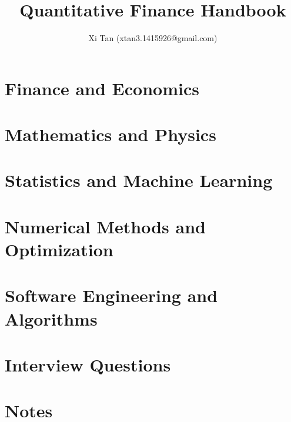 \documentclass{book}
\title{Quantitative Finance Handbook}
\author{Xi Tan (xtan3.1415926@gmail.com)}
\begin{document}
\maketitle
\tableofcontents


\part{Finance and Economics}


\part{Mathematics and Physics}


\part{Statistics and Machine Learning}



\part{Numerical Methods and Optimization}


\part{Software Engineering and Algorithms}
\part{Interview Questions}


\part{Notes}
\end{document}
